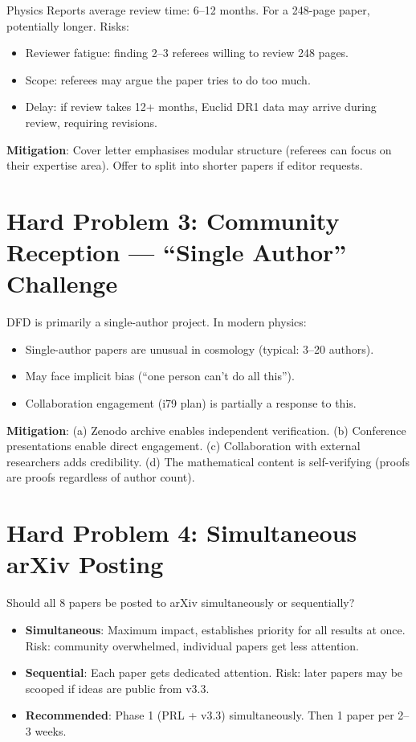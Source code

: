 \documentclass[11pt,a4paper]{article}
\begin{document}
Physics Reports average review time: 6--12 months. For a 248-page paper, potentially longer. Risks:
\begin{itemize}[nosep]
\item Reviewer fatigue: finding 2--3 referees willing to review 248 pages.
\item Scope: referees may argue the paper tries to do too much.
\item Delay: if review takes 12+ months, Euclid DR1 data may arrive during review, requiring revisions.
\end{itemize}

\textbf{Mitigation}: Cover letter emphasises modular structure (referees can focus on their expertise area). Offer to split into shorter papers if editor requests.

\section{Hard Problem 3: Community Reception --- ``Single Author'' Challenge}

DFD is primarily a single-author project. In modern physics:
\begin{itemize}[nosep]
\item Single-author papers are unusual in cosmology (typical: 3--20 authors).
\item May face implicit bias (``one person can't do all this'').
\item Collaboration engagement (i79 plan) is partially a response to this.
\end{itemize}

\textbf{Mitigation}: (a) Zenodo archive enables independent verification. (b) Conference presentations enable direct engagement. (c) Collaboration with external researchers adds credibility. (d) The mathematical content is self-verifying (proofs are proofs regardless of author count).

\section{Hard Problem 4: Simultaneous arXiv Posting}

Should all 8 papers be posted to arXiv simultaneously or sequentially?
\begin{itemize}[nosep]
\item \textbf{Simultaneous}: Maximum impact, establishes priority for all results at once. Risk: community overwhelmed, individual papers get less attention.
\item \textbf{Sequential}: Each paper gets dedicated attention. Risk: later papers may be scooped if ideas are public from v3.3.
\item \textbf{Recommended}: Phase 1 (PRL + v3.3) simultaneously. Then 1 paper per 2--3 weeks.
\end{itemize}
\end{document}
